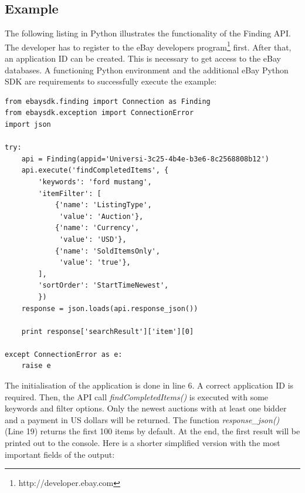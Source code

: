 \subsection{Example}
The following listing in Python illustrates the functionality of the Finding API. The developer has to register to the eBay developers program\footnote{http://developer.ebay.com} first. After that, an application ID can be created. This is necessary to get access to the eBay databases. A functioning Python environment and the additional eBay Python SDK are requirements to successfully execute the example:
\begin{lstlisting}
from ebaysdk.finding import Connection as Finding
from ebaysdk.exception import ConnectionError
import json

try:
    api = Finding(appid='Universi-3c25-4b4e-b3e6-8c2568808b12')
    api.execute('findCompletedItems', {
        'keywords': 'ford mustang',
        'itemFilter': [
            {'name': 'ListingType',
             'value': 'Auction'},
            {'name': 'Currency',
             'value': 'USD'},                
            {'name': 'SoldItemsOnly',
             'value': 'true'},                 
        ],        
        'sortOrder': 'StartTimeNewest',
        })
    response = json.loads(api.response_json())
    
    print response['searchResult']['item'][0]
    
except ConnectionError as e:
    raise e  
\end{lstlisting}
The initialisation of the application is done in line 6. A correct application ID is required. Then, the API call \textit{findCompletedItems()} is executed with some keywords and filter options. Only the newest auctions with at least one bidder and a payment in US dollars will be returned. The function \textit{response\_json()} (Line 19) returns the first 100 items by default. At the end, the first result will be printed out to the console. Here is a shorter simplified version with the most important fields of the output:
